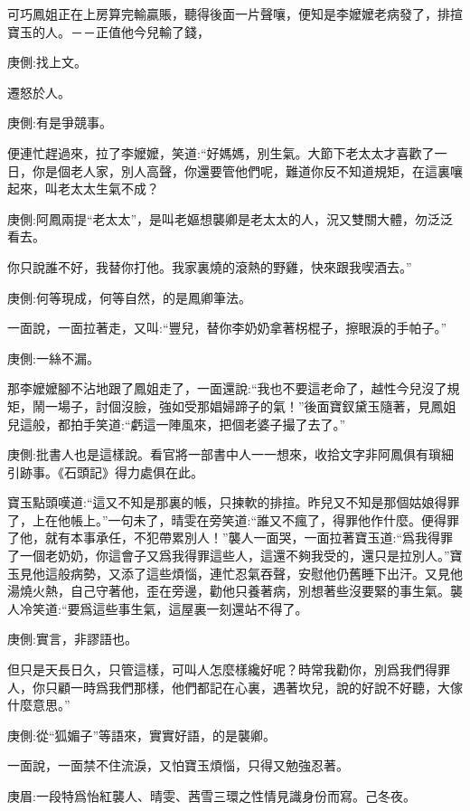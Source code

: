 \begin{parag}
    可巧鳳姐正在上房算完輸贏賬，聽得後面一片聲嚷，便知是李嬤嬤老病發了，排揎寶玉的人。－－正值他今兒輸了錢，\begin{note}庚側:找上文。\end{note}遷怒於人。\begin{note}庚側:有是爭競事。\end{note}便連忙趕過來，拉了李嬤嬤，笑道:“好媽媽，別生氣。大節下老太太才喜歡了一日，你是個老人家，別人高聲，你還要管他們呢，難道你反不知道規矩，在這裏嚷起來，叫老太太生氣不成？\begin{note}庚側:阿鳳兩提“老太太”，是叫老嫗想襲卿是老太太的人，況又雙關大體，勿泛泛看去。\end{note}你只說誰不好，我替你打他。我家裏燒的滾熱的野雞，快來跟我喫酒去。”\begin{note}庚側:何等現成，何等自然，的是鳳卿筆法。\end{note}一面說，一面拉著走，又叫:“豐兒，替你李奶奶拿著柺棍子，擦眼淚的手帕子。”\begin{note}庚側:一絲不漏。\end{note}那李嬤嬤腳不沾地跟了鳳姐走了，一面還說:“我也不要這老命了，越性今兒沒了規矩，鬧一場子，討個沒臉，強如受那娼婦蹄子的氣！”後面寶釵黛玉隨著，見鳳姐兒這般，都拍手笑道:“虧這一陣風來，把個老婆子撮了去了。”\begin{note}庚側:批書人也是這樣說。看官將一部書中人一一想來，收拾文字非阿鳳俱有瑣細引跡事。《石頭記》得力處俱在此。\end{note}
\end{parag}


\begin{parag}
    寶玉點頭嘆道:“這又不知是那裏的帳，只揀軟的排揎。昨兒又不知是那個姑娘得罪了，上在他帳上。”一句未了，晴雯在旁笑道:“誰又不瘋了，得罪他作什麼。便得罪了他，就有本事承任，不犯帶累別人！”襲人一面哭，一面拉著寶玉道:“爲我得罪了一個老奶奶，你這會子又爲我得罪這些人，這還不夠我受的，還只是拉別人。”寶玉見他這般病勢，又添了這些煩惱，連忙忍氣吞聲，安慰他仍舊睡下出汗。又見他湯燒火熱，自己守著他，歪在旁邊，勸他只養著病，別想著些沒要緊的事生氣。襲人冷笑道:“要爲這些事生氣，這屋裏一刻還站不得了。\begin{note}庚側:實言，非謬語也。\end{note}但只是天長日久，只管這樣，可叫人怎麼樣纔好呢？時常我勸你，別爲我們得罪人，你只顧一時爲我們那樣，他們都記在心裏，遇著坎兒，說的好說不好聽，大傢什麼意思。”\begin{note}庚側:從“狐媚子”等語來，實實好語，的是襲卿。\end{note}一面說，一面禁不住流淚，又怕寶玉煩惱，只得又勉強忍著。\begin{note}庚眉:一段特爲怡紅襲人、晴雯、茜雪三環之性情見識身份而寫。己冬夜。\end{note}
\end{parag}


